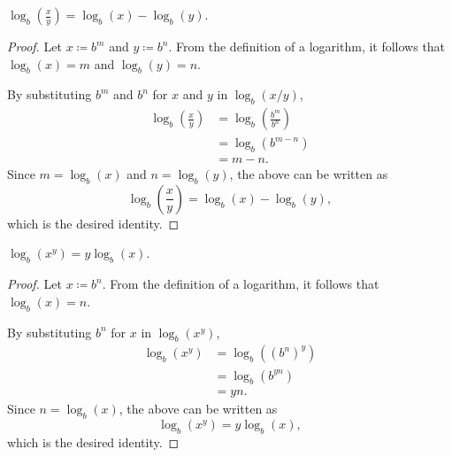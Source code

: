 \documentclass[headings=standardclasses]{scrartcl}
\begin{document}
\begin{theorem}
  \(\displaystyle \log_{b}\left(\frac{x}{y}\right) = \log_{b}(x) -
  \log_{b}(y)\).
\end{theorem}

\begin{proof}
  Let \(x ≔ b^m\) and \(y ≔ b^n\). From the definition of a logarithm, it
  follows that \(\log_b(x) = m\) and \(\log_b(y) = n\).

  By substituting \(b^m\) and \(b^n\) for \(x\) and \(y\) in \(\log_b(x/y)\),
  \begin{equation*}
  \begin{split}
    \log_b\left(\frac{x}{y}\right) &= \log_b\left(\frac{b^m}{b^n}\right) \\
                                   &= \log_b(b^{m - n}) \\
                                   &= m - n.
  \end{split}
  \end{equation*}
  Since \(m = \log_b(x)\) and \(n = \log_b(y)\), the above can be written as
  \begin{equation*}
    \log_b\left(\frac{x}{y}\right) = \log_{b}(x) - \log_{b}(y),
  \end{equation*}
  which is the desired identity.
\end{proof}

\begin{theorem}
  \(\displaystyle \log_{b}(x^y) = y\log_{b}(x)\).
\end{theorem}

\begin{proof}
  Let \(x ≔ b^n\). From the definition of a logarithm, it
  follows that \(\log_b(x) = n\).

  By substituting \(b^n\) for \(x\) in \(\log_b(x^y)\),
  \begin{equation*}
  \begin{split}
    \log_b(x^y) &= \log_b({(b^n)}^y) \\
                &= \log_b(b^{yn}) \\
                &= yn.
  \end{split}
  \end{equation*}
  Since \(n = \log_b(x)\), the above can be written as
  \begin{equation*}
    \log_b(x^y) = y\log_b(x),
  \end{equation*}
  which is the desired identity.
\end{proof}
\end{document}
